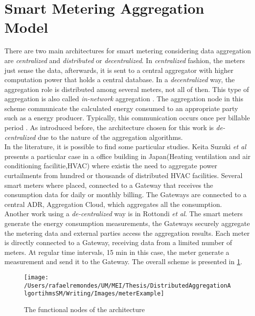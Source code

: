 \section{Smart Metering Aggregation Model} 
There are two main architectures for smart metering considering data aggregation  are \textit{centralized} and \textit{distributed} or \textit{ decentralized}\cite{journals/spm/ErkinTLP13}. In \textit{centralized} fashion, the meters just sense the data, afterwards, it is sent to a central aggregator with higher computation power that holds a central database. In a \textit{decentralized} way, the aggregation role is distributed among several meters, not all of then. This type of aggregation is also called  \textit{in-network} aggregation \cite{Girao2004c}\cite{Castelluccia05efficientaggregation}. The aggregation node in this scheme communicate the calculated energy consumed to an appropriate party such as a energy producer. Typically, this communication occurs once per billable period \cite{journals/spm/ErkinTLP13}. As introduced before, the architecture chosen for this work is \textit{de-centralized} due to the nature of the aggregation algorithms.\\
In the literature, it is possible to find some particular studies. Keita Suzuki \textit{et al} \cite{DBLP:conf/isgteurope/SuzukiNYKMKA13}  presents a particular case in a office building in Japan(Heating ventilation and air conditioning facilitie,HVAC) where existis the need to aggregate power curtailments from hundred or thousands of distributed HVAC facilities. Several smart meters where placed, connected to a Gateway that receives the consumption data for daily or monthly billing.  The Gateways are connected to a central ADR, Aggregation Cloud, which aggregates all the consumption.\\
Another work using a \textit{de-centralized} way is in Rottondi \textit{et al}\cite{rottondi2012}.  The smart meters generate the energy consumption measurements, the Gateways securely aggregate the metering data and external parties access the aggregation results. Each meter is directly connected to a Gateway, receiving data from a limited number of meters. At regular time intervals, 15 min in this case, the meter generate a measurement and send it to the Gateway. The overall scheme is presented in \ref{fig:meterArchitecture}.
\begin{figure}[h]
\centering
\texttt{[image: /Users/rafaelremondes/UM/MEI/Thesis/DistributedAggregationAlgortihmsSM/Writing/Images/meterExample]}
\caption{\label{fig:meterArchitecture} The functional nodes of the architecture}
\end{figure}


